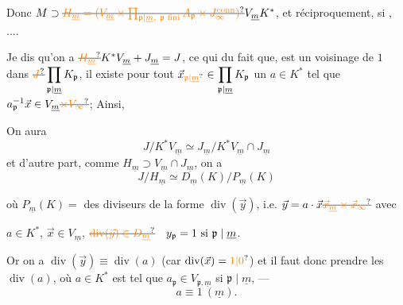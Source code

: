 Donc $M\supset\deleted{\unsure{H_{\underline m}=(V_{\underline m}\times\prod_{\mathfrak p\mid\underline m,\ \mathfrak p\text{ fini}}A_{\mathfrak p}\times J_\infty^{\mathrm{conn}})}}V_{\underline m}K^*$, et réciproquement, si , ....

Je dis qu'on a $\deleted{\unsure{H_{\underline m}}}K^*V_{\underline m}+J_{\underline m}=J$, ce qui  du fait que,   est un voisinage de $1$ dans $\deleted{\unsure{J}}\displaystyle\prod_{\mathfrak p\mid\underline m}K_{\mathfrak p}$, il existe pour tout $\vec x_{\unsure{\mathfrak p|\underline m}}\in\displaystyle\prod_{\mathfrak p\mid\underline m}K_{\mathfrak p}$ un $a\in K^*$ tel que $a_{\mathfrak p}^{-1}\vec x\in V_{\underline m}\deleted{\unsure{\times V_\infty}}$; Ainsi,

On aura
\[
J/K^*V_{\underline m}\simeq J_{\underline m}/K^*V_{\underline m}\cap J_{\underline m}
\]
 et  d'autre part, comme $H_{\underline m}\supset V_{\underline m}\cap J_{\underline m}$,  on a
\[
J/H_{\underline m}\simeq D_{\underline m}(K)/P_{\underline m}(K)
\]

où $P_{\underline m}(K)=$  des diviseurs   de la forme $\operatorname{div}(\vec y)$, i.e. $\vec y=a\cdot\vec x\deleted{\unsure{\vec x_{\underline m}\times\vec x_\infty}}$ avec


$a\in K^*$, $\vec x\in V_{\underline m}$, $\deleted{\unsure{\operatorname{div}(\vec y)\in D_{\underline m}}}\quad y_{\mathfrak p}=1\text{ si }\mathfrak p\mid\underline m$.

Or on a $\operatorname{div}(\vec y)\equiv\operatorname{div}(a)$ (car $\operatorname{div}(\vec x)=\unsure{1|0}$) et il faut donc prendre les $\operatorname{div}(a)$, où $a\in K^*$ est tel que $a_{\mathfrak p}\in V_{\mathfrak p,\underline m}$ si $\mathfrak p\mid\underline m$, --- 
\[
a\equiv1\ (\underline m).
\]

